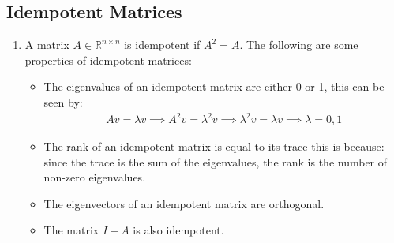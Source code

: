 \documentclass[letterpaper, 11pt]{article}
\newcommand{\R}{\mathbb{R}}	%
\newcommand{\1}{\mathds{1}}	%
\theoremstyle{definition}
\begin{document}
\subsection{Idempotent Matrices}
\begin{enumerate}
    \item A matrix $A \in \R^{n \times n}$ is idempotent if $A^2 = A$. The following are some properties of idempotent matrices:
    \begin{itemize}
        
        \item The eigenvalues of an idempotent matrix are either 0 or 1, this can be seen by:
        \begin{align}
            A v = \lambda v \implies A^2 v = \lambda^2 v \implies \lambda^2 v = \lambda v \implies \lambda = 0,1
        \end{align}
        \item The rank of an idempotent matrix is equal to its trace this is 
        because: since the trace is 
        the sum of the eigenvalues, the rank is the number of non-zero eigenvalues.
        \item The eigenvectors of an idempotent matrix are orthogonal. 
        \item The matrix $I - A$ is also idempotent.
    \end{itemize}
\end{enumerate}
\end{document}
